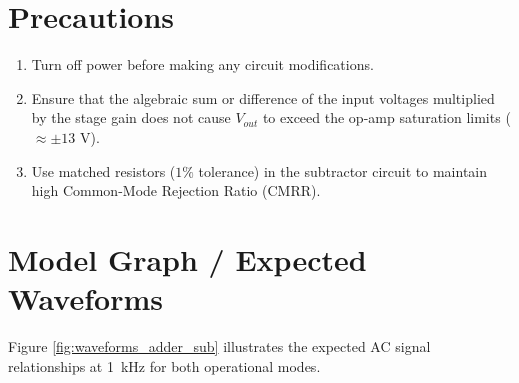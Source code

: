 \section{Precautions}
\begin{enumerate}
	\item Turn off power before making any circuit modifications.
	\item Ensure that the algebraic sum or difference of the input voltages multiplied by the stage gain does not cause $V_{out}$ to exceed the op-amp saturation limits ($\approx \pm 13\text{ V}$).
	\item Use matched resistors ($1\%$ tolerance) in the subtractor circuit to maintain high Common-Mode Rejection Ratio (CMRR).
\end{enumerate}

\section{Model Graph / Expected Waveforms}
Figure \ref{fig:waveforms_adder_sub} illustrates the expected AC signal relationships at \SI{1}{\kilo\hertz} for both operational modes.

